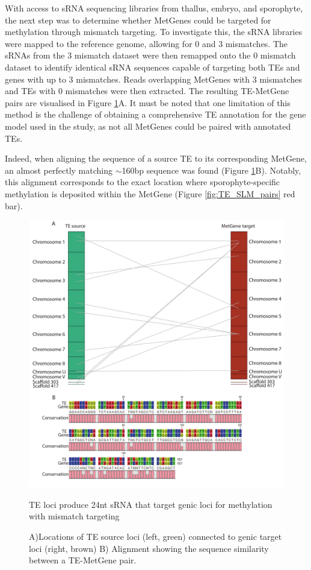 With access to sRNA sequencing libraries from thallus, embryo, and sporophyte, the next step was to determine whether MetGenes could be targeted for methylation through mismatch targeting. To investigate this, the sRNA libraries were mapped to the reference genome, allowing for 0 and 3 mismatches. The sRNAs from the 3 mismatch dataset were then remapped onto the 0 mismatch dataset to identify identical sRNA sequences capable of targeting both TEs and genes with up to 3 mismatches. Reads overlapping MetGenes with 3 mismatches and TEs with 0 mismatches were then extracted. The resulting TE-MetGene pairs are visualised in Figure \ref{fig:SLM_targeting}A. It must be noted that one limitation of this method is the challenge of obtaining a comprehensive TE annotation for the gene model used in the study, as not all MetGenes could be paired with annotated TEs.

Indeed, when aligning the sequence of a source TE to its corresponding MetGene, an almost perfectly matching $\sim$160bp sequence was found (Figure \ref{fig:SLM_targeting}B). Notably, this alignment corresponds to the exact location where sporophyte-specific methylation is deposited within the MetGene (Figure \ref{fig:TE_SLM_pairs} red bar).

\begin{figure}[htbp!] 
\centering    
    \includegraphics[width=1\textwidth]{Chapter3/Figs/Figure5_SLM_source_target.pdf}
\caption{TE loci produce 24nt sRNA that target genic loci for methylation with mismatch targeting}
\label{fig:SLM_targeting}
\captionsetup{font=small}
    \caption*{A)Locations of TE source loci (left, green) connected to genic target loci (right, brown) B) Alignment showing the sequence similarity between a TE-MetGene pair.}
\end{figure}


